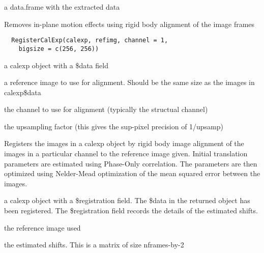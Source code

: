 \documentclass[a4paper]{book}
\begin{document}
%
\begin{Value}
a data.frame with the extracted data
\end{Value}
%
\begin{Description}\relax
Removes in-plane motion effects using rigid body
alignment of the image frames
\end{Description}
%
\begin{Usage}
\begin{verbatim}
  RegisterCalExp(calexp, refimg, channel = 1,
    bigsize = c(256, 256))
\end{verbatim}
\end{Usage}
%
\begin{Arguments}
\begin{ldescription}
\item[\code{calexp}] a calexp object with a \bsl{}\$data field

\item[\code{refimg}] a reference image to use for alignment.
Should be the same size as the images in calexp\bsl{}\$data

\item[\code{channel}] the channel to use for alignment
(typically the structual channel)

\item[\code{upsamp}] the upsampling factor (this gives the
sup-pixel precision of 1/upsamp)
\end{ldescription}
\end{Arguments}
%
\begin{Details}\relax
Registers the images in a calexp object by rigid body
image alignment of the images in a particular channel to
the reference image given.  Initial translation
parameters are estimated using Phase-Only correlation.
The parameters are then optimized using Nelder-Mead
optimization of the mean squared error between the
images.
\end{Details}
%
\begin{Value}
a calexp object with a \bsl{}\$registration field.  The \bsl{}\$data
in the returned object has been registered.  The
\bsl{}\$registration field records the details of the estimated
shifts.  \begin{ldescription}
\item[\code{refimg}] the reference image used
\item[\code{mpars}] the estimated shifts. This is a matrix of
size nframes-by-2
\end{ldescription}
\end{Value}
\end{document}
